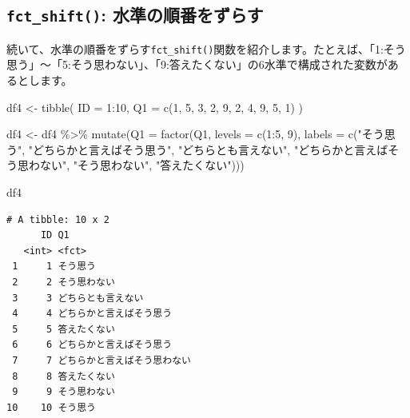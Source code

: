 \documentclass[
  a4paper,
  pandoc,
  ja=standard,
  jafont=haranoaji]{bxjsbook}
\newenvironment{Shaded}{\begin{snugshade}}{\end{snugshade}}
\newcommand{\AttributeTok}[1]{\textcolor[rgb]{0.00,0.48,0.65}{#1}}
\newcommand{\DecValTok}[1]{\textcolor[rgb]{0.68,0.00,0.00}{#1}}
\newcommand{\FunctionTok}[1]{\textcolor[rgb]{0.28,0.35,0.67}{#1}}
\newcommand{\NormalTok}[1]{\textcolor[rgb]{0.00,0.48,0.65}{#1}}
\newcommand{\OtherTok}[1]{\textcolor[rgb]{0.00,0.48,0.65}{#1}}
\newcommand{\SpecialCharTok}[1]{\textcolor[rgb]{0.37,0.37,0.37}{#1}}
\newcommand{\StringTok}[1]{\textcolor[rgb]{0.13,0.47,0.30}{#1}}
\begin{document}
\hypertarget{fct_shift-ux6c34ux6e96ux306eux9806ux756aux3092ux305aux3089ux3059}{%
\subsection{\texorpdfstring{\texttt{fct\_shift()}:
水準の順番をずらす}{fct\_shift(): 水準の順番をずらす}}\label{fct_shift-ux6c34ux6e96ux306eux9806ux756aux3092ux305aux3089ux3059}}

続いて、水準の順番をずらす\texttt{fct\_shift()}関数を紹介します。たとえば、「1:そう思う」〜「5:そう思わない」、「9:答えたくない」の6水準で構成された変数があるとします。

\begin{Shaded}
\begin{Highlighting}[numbers=left,,]
\NormalTok{df4 }\OtherTok{\textless{}{-}} \FunctionTok{tibble}\NormalTok{(}
  \AttributeTok{ID =} \DecValTok{1}\SpecialCharTok{:}\DecValTok{10}\NormalTok{,}
  \AttributeTok{Q1 =} \FunctionTok{c}\NormalTok{(}\DecValTok{1}\NormalTok{, }\DecValTok{5}\NormalTok{, }\DecValTok{3}\NormalTok{, }\DecValTok{2}\NormalTok{, }\DecValTok{9}\NormalTok{, }\DecValTok{2}\NormalTok{, }\DecValTok{4}\NormalTok{, }\DecValTok{9}\NormalTok{, }\DecValTok{5}\NormalTok{, }\DecValTok{1}\NormalTok{)}
\NormalTok{) }

\NormalTok{df4 }\OtherTok{\textless{}{-}}\NormalTok{ df4 }\SpecialCharTok{\%\textgreater{}\%}
  \FunctionTok{mutate}\NormalTok{(}\AttributeTok{Q1 =} \FunctionTok{factor}\NormalTok{(Q1, }\AttributeTok{levels =} \FunctionTok{c}\NormalTok{(}\DecValTok{1}\SpecialCharTok{:}\DecValTok{5}\NormalTok{, }\DecValTok{9}\NormalTok{),}
                     \AttributeTok{labels =} \FunctionTok{c}\NormalTok{(}\StringTok{"そう思う"}\NormalTok{, }
                                \StringTok{"どちらかと言えばそう思う"}\NormalTok{,}
                                \StringTok{"どちらとも言えない"}\NormalTok{,}
                                \StringTok{"どちらかと言えばそう思わない"}\NormalTok{,}
                                \StringTok{"そう思わない"}\NormalTok{,}
                                \StringTok{"答えたくない"}\NormalTok{)))}

\NormalTok{df4}
\end{Highlighting}
\end{Shaded}

\begin{verbatim}
# A tibble: 10 x 2
      ID Q1                          
   <int> <fct>                       
 1     1 そう思う                    
 2     2 そう思わない                
 3     3 どちらとも言えない          
 4     4 どちらかと言えばそう思う    
 5     5 答えたくない                
 6     6 どちらかと言えばそう思う    
 7     7 どちらかと言えばそう思わない
 8     8 答えたくない                
 9     9 そう思わない                
10    10 そう思う                    
\end{verbatim}
\end{document}
